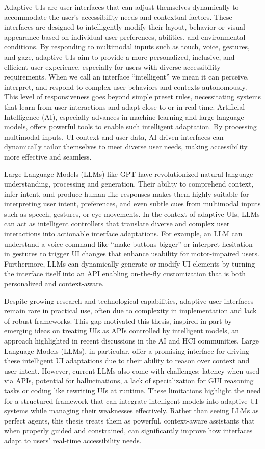 \documentclass[openany]{book}
\begin{document}
Adaptive UIs are user interfaces that can adjust themselves dynamically to accommodate the user’s accessibility needs and contextual factors. These interfaces are designed to intelligently modify their layout, behavior or visual appearance based on individual user preferences, abilities, and environmental conditions. By responding to multimodal inputs such as touch, voice, gestures, and gaze, adaptive UIs aim to provide a more personalized, inclusive, and efficient user experience, especially for users with diverse accessibility requirements. When we call an interface “intelligent” we mean it can perceive, interpret, and respond to complex user behaviors and contexts autonomously. This level of responsiveness goes beyond simple preset rules, necessitating systems that learn from user interactions and adapt close to or in real-time. Artificial Intelligence (AI), especially advances in machine learning and large language models, offers powerful tools to enable such intelligent adaptation. By processing multimodal inputs, UI context and user data, AI-driven interfaces can dynamically tailor themselves to meet diverse user needs, making accessibility more effective and seamless.

Large Language Models (LLMs) like GPT have revolutionized natural language understanding, processing and generation. Their ability to comprehend context, infer intent, and produce human-like responses makes them highly suitable for interpreting user intent, preferences, and even subtle cues from multimodal inputs such as speech, gestures, or eye movements.
In the context of adaptive UIs, LLMs can act as intelligent controllers that translate diverse and complex user interactions into actionable interface adaptations. For example, an LLM can understand a voice command like “make buttons bigger” or interpret hesitation in gestures to trigger UI changes that enhance usability for motor-impaired users. Furthermore, LLMs can dynamically generate or modify UI elements by turning the interface itself into an API enabling on-the-fly customization that is both personalized and context-aware.

Despite growing research and technological capabilities, adaptive user interfaces remain rare in practical use, often due to complexity in implementation and lack of robust frameworks. This gap motivated this thesis, inspired in part by emerging ideas on treating UIs as APIs controlled by intelligent models, an approach highlighted in recent discussions in the AI and HCI communities. Large Language Models (LLMs), in particular, offer a promising interface for driving these intelligent UI adaptations due to their ability to reason over context and user intent. However, current LLMs also come with challenges: latency when used via APIs, potential for hallucinations, a lack of specialization for GUI reasoning tasks or coding like rewriting UIs at runtime. These limitations highlight the need for a structured framework that can integrate intelligent models into adaptive UI systems while managing their weaknesses effectively. Rather than seeing LLMs as perfect agents, this thesis treats them as powerful, context-aware assistants that when properly guided and constrained, can significantly improve how interfaces adapt to users' real-time accessibility needs.
\end{document}
